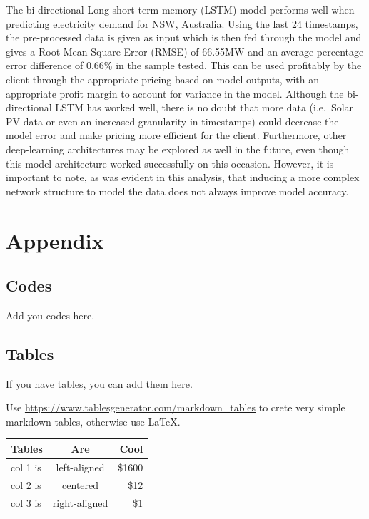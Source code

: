 \documentclass[mstat,12pt]{unswthesis}
\begin{document}
The bi-directional Long short-term memory (LSTM) model performs well
when predicting electricity demand for NSW, Australia. Using the last 24
timestamps, the pre-processed data is given as input which is then fed
through the model and gives a Root Mean Square Error (RMSE) of 66.55MW
and an average percentage error difference of 0.66\% in the sample
tested. This can be used profitably by the client through the
appropriate pricing based on model outputs, with an appropriate profit
margin to account for variance in the model. Although the bi-directional
LSTM has worked well, there is no doubt that more data (i.e.~Solar PV
data or even an increased granularity in timestamps) could decrease the
model error and make pricing more efficient for the client. Furthermore,
other deep-learning architectures may be explored as well in the future,
even though this model architecture worked successfully on this
occasion. However, it is important to note, as was evident in this
analysis, that inducing a more complex network structure to model the
data does not always improve model accuracy.




\hypertarget{appendix}{%
\chapter*{Appendix}\label{appendix}}

\hypertarget{codes}{%
\section*{\texorpdfstring{\textbf{Codes}}{Codes}}\label{codes}}

Add you codes here.

\hypertarget{tables}{%
\section*{\texorpdfstring{\textbf{Tables}}{Tables}}\label{tables}}

If you have tables, you can add them here.

Use \url{https://www.tablesgenerator.com/markdown_tables} to crete very
simple markdown tables, otherwise use \LaTeX.

\begin{longtable}[]{@{}lcr@{}}
\toprule
Tables & Are & Cool \\
\midrule
\endhead
col 1 is & left-aligned & \$1600 \\
col 2 is & centered & \$12 \\
col 3 is & right-aligned & \$1 \\
\bottomrule
\end{longtable}
\end{document}

